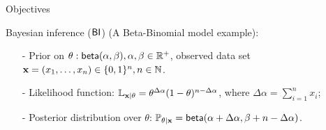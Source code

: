 \documentclass[final,hyperref={pdfpagelabels=false}]{beamer}
\begin{document}
\begin{frame}[t]
\begin{columns}[t]
\begin{column}{.485\textwidth}
\begin{block}{Objectives}

\end{block}

            
\begin{block}{Bayesian inference ($\mathsf{BI}$) (A Beta-Binomial model example):}
\begin{itemize}
  \item[-] Prior on $\theta: \mathsf{beta}(\alpha, \beta), \alpha,\beta\in\mathbb{R}^{+}$, observed data set $\textbf{x}= (x_1,\dots, x_n)\in\{0,1\}^{n}, n\in\mathbb{N}$.

  \item[-] Likelihood function: $\mathbb{L}_{\textbf{x} | \theta}= \theta^{\Delta \alpha}(1-\theta)^{n - \Delta \alpha}$, where $\Delta \alpha = \displaystyle\sum_{i=1}^{n}x_i$;

  \item[-] Posterior distribution over $\theta$: $\mathbb{P}_{\theta|\textbf{x}}=\mathsf{beta}(\alpha + \Delta \alpha,\beta + n - \Delta \alpha)$.
\end{itemize}
\end{block}



\end{column}
\end{columns}
\end{frame}
\end{document}
